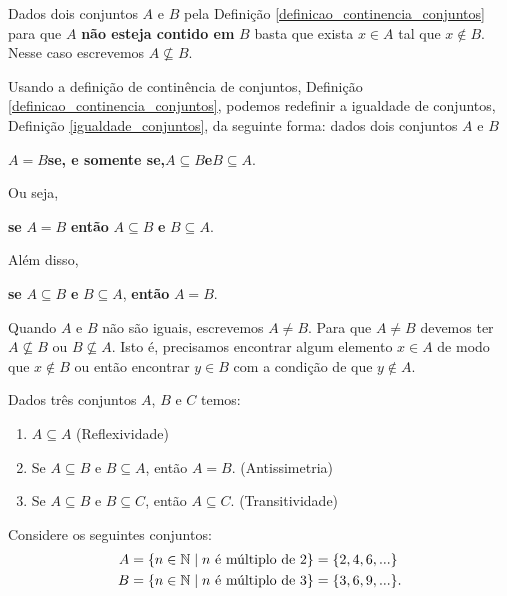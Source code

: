 \begin{observacao}
    Dados dois conjuntos $A$ e $B$ pela Definição \ref{definicao_continencia_conjuntos} para que $A$ \textbf{não esteja contido em} $B$ basta que exista $x \in A$ tal que $x \notin B$. Nesse caso escrevemos $A \nsubseteq B$.
\end{observacao}

Usando a definição de continência de conjuntos, Definição \ref{definicao_continencia_conjuntos}, podemos redefinir a igualdade de conjuntos, Definição \ref{igualdade_conjuntos}, da seguinte forma: dados dois conjuntos $A$ e $B$
\begin{center}
    $A = B$\quad \textbf{se, e somente se,}\quad $A \subseteq B$\quad \textbf{e}\quad $B \subseteq A$.
\end{center}

Ou seja,
\begin{center}
    \textbf{se} $A = B$ \textbf{então} $A \subseteq B$ \textbf{e} $B \subseteq A$.
\end{center}

Além disso,
\begin{center}
    \textbf{se} $A \subseteq B$ \textbf{e} $B \subseteq A$, \textbf{então} $A = B$.
\end{center}

Quando $A$ e $B$ não são iguais, escrevemos $A \neq B$. Para que $A \neq B$ devemos ter $A \nsubseteq B$ ou $B \nsubseteq A$. Isto é, precisamos encontrar algum elemento $x \in A$ de modo que $x \notin B$ ou então encontrar $y \in B$ com a condição de que $y \notin A$.

\begin{proposicao}
    Dados três conjuntos $A$, $B$ e $C$ temos:
    \begin{enumerate}[label={\roman*})]
        \item $A\subseteq A$ (Reflexividade)
        \item Se $A\subseteq B \mbox{ e } B\subseteq A$, então $A=B$. (Antissimetria)
        \item Se $A\subseteq B$ e $B\subseteq C$, então $A\subseteq C$. (Transitividade)
    \end{enumerate}
\end{proposicao}


Considere os seguintes conjuntos:
\begin{align*}
    A &= \{ n \in \mathbb{N} \mid n \mbox{ é múltiplo de } 2\} = \{2,4,6,...\}\\
    B &= \{n \in \mathbb{N} \mid n \mbox{ é múltiplo de } 3\} = \{3,6,9,...\}.
\end{align*}


